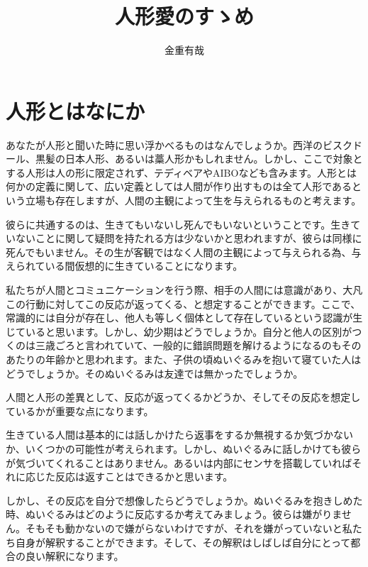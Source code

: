 \documentclass[b5j,twoside,twocolumn]{utarticle}
\title{人形愛のすゝめ}
\author{金重有哉}
\date{\vspace{-5mm}}
\makeatletter
\def\yakuchu{%
\@ifnextchar[\@xfootnote %
{\stepcounter{yakuchu}%
\protected@xdef\@thefnmark{\theyakuchu}%
\@footnotemark\@footnotetext}}
\makeatother
\begin{document}
\maketitle

\setlength{\footskip}{-2mm}
\chead[]{}
\rhead[人形愛のすゝめ]{}
\lfoot[]{\thepage{}}
\cfoot[]{}
\rfoot[\thepage{}]{}

\let\yakuchu=\endnote
\renewcommand{\footnoterule}{\noindent\rule{100mm}{0.3mm}\vskip2mm}
\thispagestyle{fancy}
\section*{人形とはなにか}
あなたが人形と聞いた時に思い浮かべるものはなんでしょうか。西洋のビスクドール、黒髪の日本人形、あるいは藁人形かもしれません。しかし、ここで対象とする人形は人の形に限定されず、テディベアやAIBOなども含みます。人形とは何かの定義に関して、広い定義としては人間が作り出すものは全て人形であるという立場も存在しますが、人間の主観によって生を与えられるものと考えます。


彼らに共通するのは、生きてもいないし死んでもいないということです。生きていないことに関して疑問を持たれる方は少ないかと思われますが、彼らは同様に死んでもいません。その生が客観ではなく人間の主観によって与えられる為、与えられている間仮想的に生きていることになります。


私たちが人間とコミュニケーションを行う際、相手の人間には意識があり、大凡この行動に対してこの反応が返ってくる、と想定することができます。ここで、常識的には自分が存在し、他人も等しく個体として存在しているという認識が生じていると思います。しかし、幼少期はどうでしょうか。自分と他人の区別がつくのは三歳ごろと言われていて、一般的に錯誤問題を解けるようになるのもそのあたりの年齢かと思われます。また、子供の頃ぬいぐるみを抱いて寝ていた人はどうでしょうか。そのぬいぐるみは友達では無かったでしょうか。


人間と人形の差異として、反応が返ってくるかどうか、そしてその反応を想定しているかが重要な点になります。


生きている人間は基本的には話しかけたら返事をするか無視するか気づかないか、いくつかの可能性が考えられます。しかし、ぬいぐるみに話しかけても彼らが気づいてくれることはありません。あるいは内部にセンサを搭載していればそれに応じた反応は返すことはできるかと思います。


しかし、その反応を自分で想像したらどうでしょうか。ぬいぐるみを抱きしめた時、ぬいぐるみはどのように反応するか考えてみましょう。彼らは嫌がりません。そもそも動かないので嫌がらないわけですが、それを嫌がっていないと私たち自身が解釈することができます。そして、その解釈はしばしば自分にとって都合の良い解釈になります。
\end{document}

